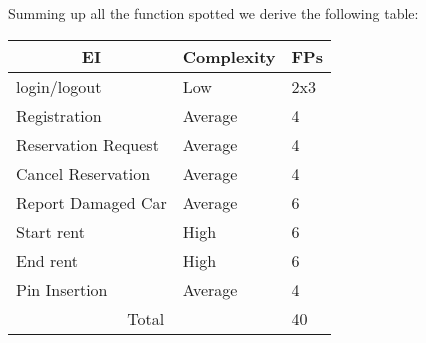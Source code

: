 Summing up all the function spotted we derive the following table:
\begin{center}
\begin{tabular}{|l l l|}
\hline
\multicolumn{1}{|c}{EI}&Complexity&FPs\\
\hline
login/logout & Low & 2x3\\
Registration & Average & 4\\
Reservation Request &Average&4\\
Cancel Reservation & Average&4\\
Report Damaged Car & Average&6\\
Start rent& High & 6\\
End rent & High & 6\\
Pin Insertion &  Average&4\\\hline
\multicolumn{2}{|c}{Total}&40\\
\hline
\end{tabular}
\end{center}

